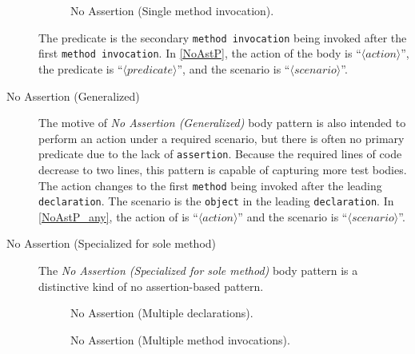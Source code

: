\documentclass[proposal.tex]{subfiles}
\begin{document}
\begin{description}
\begin{figure}[H]
\centering
    \begin{subfigure}{0.45\textwidth}
    \end{subfigure}
\caption{No Assertion (Single method invocation).}
\label{NoAstP_MC}
\end{figure}

The predicate is the secondary \texttt{method invocation} being invoked after the first \texttt{method invocation}.
%
In \cref{NoAstP}, the action of the body is \enquote{$\langle action \rangle$}, the predicate is \enquote{$\langle predicate \rangle$}, and the scenario is \enquote{$\langle scenario \rangle$}.


\item[No Assertion (Generalized)] 


The motive of \textit{No Assertion (Generalized)} body pattern is also intended to perform an action under a required scenario, but there is often no primary predicate due to the lack of \texttt{assertion}.
%
Because the required lines of code decrease to two lines, this pattern is capable of capturing more test bodies.
%
The action changes to the first \texttt{method} being invoked after the leading \texttt{declaration}.
%
The scenario is the \texttt{object} in the leading \texttt{declaration}.
%
In \cref{NoAstP_any}, the action of is \enquote{$\langle action \rangle$} and the scenario is \enquote{$\langle scenario \rangle$}.

\item[No Assertion (Specialized for sole method)]

The \textit{No Assertion (Specialized for sole method)} body pattern is a distinctive kind of no assertion-based pattern.

\begin{figure}[H]
\centering
    \begin{subfigure}{0.7\textwidth}
    \end{subfigure}
\caption{No Assertion (Multiple declarations).}
\label{NoAstP_m_dec}
\end{figure}

\begin{figure}[H]
\centering
    \begin{subfigure}{0.45\textwidth}
    \end{subfigure}
\caption{No Assertion (Multiple method invocations).}
\label{NoAstP_m_MC}
\end{figure}


\end{description}
\end{document}
